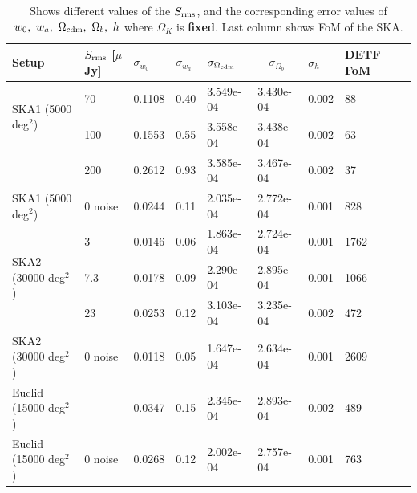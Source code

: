 \documentclass[useAMS,usenatbib]{mn2e}
\begin{document}
 
\begin{table}
\caption{Shows different values of the $S_{\rm rms}$, and the corresponding  error values  of $w_0, \  w_a, \ \Omega_{{\rm cdm}}, \ \Omega_b, \ h$  where $\Omega_K$ is {\bf fixed}. Last column shows FoM of the SKA.}
\begin{tabular}{ |l|l|l|l||l||l|l|l|l|}
\hline
\hline 
\multirow{1}{*}{Setup}& $S_{\rm rms}$  [$\mu$Jy] & $\sigma_{w_0}$ &  $\sigma_{w_a}$ &  $\sigma_{\Omega_{{\rm cdm}}} $ & $\quad \sigma_{\Omega_b}$ & $\sigma_{h}$ & DETF FoM \\
   \hline
\multirow{2}{*}{SKA1 (5000 deg$^2$) }
   & 70 & 0.1108 & 0.40 & 3.549e-04 & 3.430e-04 & 0.002 & 88  \\
   & 100 & 0.1553 & 0.55 & 3.558e-04 & 3.438e-04 & 0.002 & 63  \\
      & 200 & 0.2612 & 0.93 & 3.585e-04 & 3.467e-04  & 0.002 & 37  \\
\hline
  \hline
\multirow{1}{*}{SKA1 (5000 deg$^2$)}
 & 0 noise & 0.0244 & 0.11 & 2.035e-04 & 2.772e-04  & 0.001 & 828  \\
     \hline
\multirow{3}{*}{SKA2 (30000 deg$^2$)}

  & 3 & 0.0146 & 0.06 & 1.863e-04 & 2.724e-04  & 0.001 & 1762  \\
   &7.3& 0.0178 & 0.09 & 2.290e-04 & 2.895e-04  & 0.001 & 1066  \\ 
     & 23& 0.0253 & 0.12 & 3.103e-04 & 3.235e-04 & 0.002 & 472  \\
      \hline
  \hline
\multirow{1}{*}{SKA2 (30000 deg$^2$)}
 & 0 noise& 0.0118 & 0.05 & 1.647e-04 & 2.634e-04  & 0.001 & 2609  \\
     \hline

\multirow{1}{*}{Euclid (15000 deg$^2$)}
 & -  & 0.0347 & 0.15 & 2.345e-04 & 2.893e-04  & 0.002 & 489  \\
  \hline
          \hline
\multirow{1}{*}{Euclid (15000 deg$^2$)}
 & 0 noise& 0.0268 & 0.12 & 2.002e-04 & 2.757e-04  & 0.001 & 763  \\
     \hline
\end{tabular}
\label{Table:summary_w_wo_ok_fixed_all}
\end{table}
\end{document}

